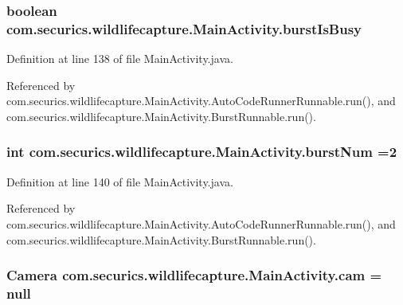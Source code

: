\subsubsection[{burst\+Is\+Busy}]{\setlength{\rightskip}{0pt plus 5cm}boolean com.\+securics.\+wildlifecapture.\+Main\+Activity.\+burst\+Is\+Busy\hspace{0.3cm}{\ttfamily [private]}}\label{classcom_1_1securics_1_1wildlifecapture_1_1_main_activity_ae9b4d030cd6337e81af673f135a024a8}


Definition at line 138 of file Main\+Activity.\+java.



Referenced by com.\+securics.\+wildlifecapture.\+Main\+Activity.\+Auto\+Code\+Runner\+Runnable.\+run(), and com.\+securics.\+wildlifecapture.\+Main\+Activity.\+Burst\+Runnable.\+run().

\subsubsection[{burst\+Num}]{\setlength{\rightskip}{0pt plus 5cm}int com.\+securics.\+wildlifecapture.\+Main\+Activity.\+burst\+Num =2\hspace{0.3cm}{\ttfamily [private]}}\label{classcom_1_1securics_1_1wildlifecapture_1_1_main_activity_a97dba74479a63351478bdfe1a962c4b5}


Definition at line 140 of file Main\+Activity.\+java.



Referenced by com.\+securics.\+wildlifecapture.\+Main\+Activity.\+Auto\+Code\+Runner\+Runnable.\+run(), and com.\+securics.\+wildlifecapture.\+Main\+Activity.\+Burst\+Runnable.\+run().

\subsubsection[{cam}]{\setlength{\rightskip}{0pt plus 5cm}Camera com.\+securics.\+wildlifecapture.\+Main\+Activity.\+cam = null\hspace{0.3cm}{\ttfamily [private]}}\label{classcom_1_1securics_1_1wildlifecapture_1_1_main_activity_a9249bb7c2b8b3ac253f6090c2f36f696}


